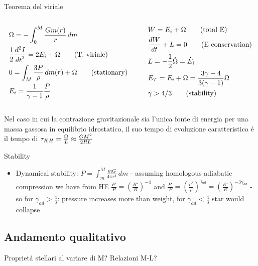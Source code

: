 \begin{frame}{Teorema del viriale}
\begin{columns}[T]
	\begin{column}{0.45\textwidth}
		\begin{align*}
&\Omega=-\int_0^M\frac{Gm(r)}{r}\,dm\\
&\frac{1}{2}\TtwoDy{t}{I}=2E_i+\Omega\tag{T. viriale}\\
&0=\int_M\frac{3P}{\rho}\,dm(r)+\Omega\tag{stationary}\\
&E_i=\frac{1}{\gamma-1}\frac{P}{\rho}
		\end{align*}
	\end{column}\begin{column}{0.55\textwidth}
		\begin{align*}
&W=E_i+\Omega \tag{total E}\\
&\TDy{t}{W}+L=0\tag{E conservation}\\
&L=-\frac{1}{2}\dot{\Omega}=\dot{E}_i\\
&E_T=E_i+\Omega=\frac{3\gamma-4}{3(\gamma-1)}\Omega\\
&\gamma>4/3\tag{stability}
		\end{align*}
	\end{column}
\end{columns}
Nel caso in cui la contrazione gravitazionale sia l'unica fonte di energia per una massa gassosa in equilibrio idrostatico, il suo tempo di evoluzione caratteristico \'e il tempo di \kh{} $\tkh{}=\frac{\Omega}{L}\approx\frac{GM^2}{2RL}$
\end{frame}

\begin{frame}{Stability}\frameintoc
	\begin{itemize}
		\item 
			Dynamical stability: $P=\int_m^M\frac{mG}{4\pi r^4}\,dm$ - assuming homologous adiabatic compression we have from HE $\frac{P'}{P}=(\frac{R'}{R})^{-4}$ and $\frac{P'}{P}=(\frac{\rho'}{\rho})^{\gamma_{ad}}=(\frac{R'}{R})^{-3\gamma_{ad}}$ - so for $\gamma_{ad}>\frac{4}{3}$: pressure increases more than weight, for $\gamma_{ad}<\frac{4}{3}$ star would collapse
		\end{itemize}
	\end{frame}

    \subsection{Andamento qualitativo}
    
    \begin{frame}{Propriet\'a stellari al variare di M? Relazioni M-L?}

    \end{frame}
    
